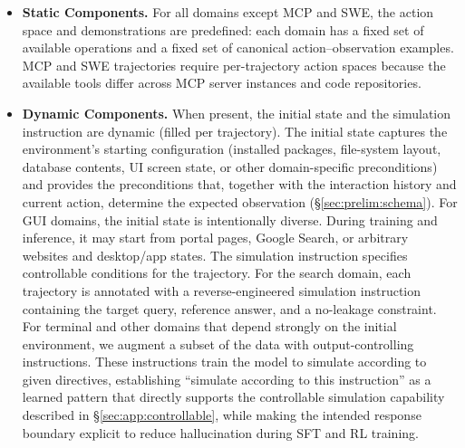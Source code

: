 \begin{itemize}[leftmargin=1.5em,itemsep=2pt]
\item \textbf{Static Components.}
For all domains except MCP and SWE, the action space and demonstrations are predefined: each domain has a fixed set of available operations and a fixed set of canonical action--observation examples.
MCP and SWE trajectories require per-trajectory action spaces because the available tools differ across MCP server instances and code repositories.
\item \textbf{Dynamic Components.}
When present, the initial state and the simulation instruction are dynamic (filled per trajectory).
The initial state captures the environment's starting configuration (installed packages, file-system layout, database contents, UI screen state, or other domain-specific preconditions) and provides the preconditions that, together with the interaction history and current action, determine the expected observation (\S\ref{sec:prelim:schema}).
For GUI domains, the initial state is intentionally diverse.
During training and inference, it may start from portal pages, Google Search, or arbitrary websites and desktop/app states.
The simulation instruction specifies controllable conditions for the trajectory.
For the search domain, each trajectory is annotated with a reverse-engineered simulation instruction containing the target query, reference answer, and a no-leakage constraint.
For terminal and other domains that depend strongly on the initial environment, we augment a subset of the data with output-controlling instructions.
These instructions train the model to simulate according to given directives, establishing ``simulate according to this instruction'' as a learned pattern that directly supports the controllable simulation capability described in \S\ref{sec:app:controllable}, while making the intended response boundary explicit to reduce hallucination during SFT and RL training.
\end{itemize}

